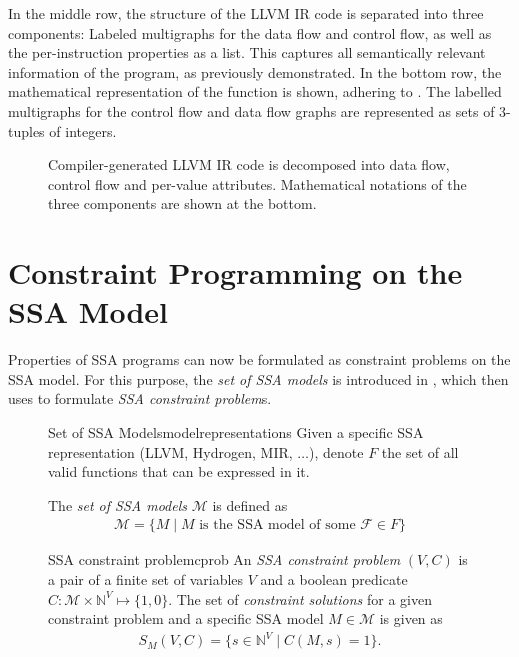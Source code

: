     In the middle row, the structure of the LLVM IR code is separated into three
    components:
    Labeled multigraphs for the data flow and control flow, as well as
    the per-instruction properties as a list.
    This captures all semantically relevant information of the program,
    as previously demonstrated.
    In the bottom row, the mathematical representation of the function is shown,
    adhering to .
    The labelled multigraphs for the control flow and data flow graphs are
    represented as sets of $3$-tuples of integers.

\begin{figure}[p]

\caption{Compiler-generated LLVM IR code is decomposed into data flow, control
         flow and per-value attributes.
         Mathematical notations of the three components are shown at the
         bottom.}
\label{fig:derivemaths}
\end{figure}

\section{Constraint Programming on the SSA Model}
\label{sec:constraintprogramming}

    Properties of SSA programs can now be formulated as constraint problems on
    the SSA model.
    For this purpose, the {\it set of SSA models} is introduced in
    , which  then uses to
    formulate {\em SSA constraint problem}s.

\begin{figure}[H]
\begin{definition}{Set of SSA Models}{modelrepresentations}
    Given a specific SSA representation (LLVM, Hydrogen, MIR, $\dots$),
    denote $F$ the set of all valid functions that can be expressed in it.

    The {\em set of SSA models} $\mathcal M$ is defined as
    \begin{align*}
        \mathcal M=\{M\mid M \text{ is the SSA model of some }\mathcal F\in F\}
    \end{align*}
\end{definition}

\begin{definition}{SSA constraint problem}{cprob}
    An {\it SSA constraint problem} $(V,C)$ is a pair of a finite set of
    variables $V$ and a boolean predicate
    $C\colon\mathcal M\times\mathbb N^V\mapsto\{1,0\}$.
    The set of {\em constraint solutions} for a given constraint problem and a
    specific SSA model $M\in\mathcal M$ is given as
    \begin{align*}
        S_M(V,C) = \{s\in\mathbb N^V\mid C(M,s)=1\}.
    \end{align*}
\end{definition}
\end{figure}

